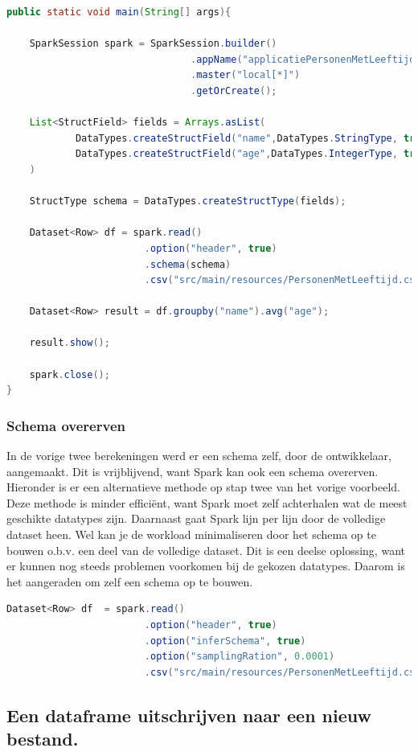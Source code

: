 \documentclass[a4paper,10pt,twoside]{report}
\begin{document}
\begin{lstlisting}[language=Java]
public static void main(String[] args){
	
	SparkSession spark = SparkSession.builder()
								.appName("applicatiePersonenMetLeeftijd")
								.master("local[*]")
								.getOrCreate();
								
	List<StructField> fields = Arrays.asList(
			DataTypes.createStructField("name",DataTypes.StringType, true),
			DataTypes.createStructField("age",DataTypes.IntegerType, true);
	)
	
	StructType schema = DataTypes.createStructType(fields);
	
	Dataset<Row> df = spark.read()
						.option("header", true)
						.schema(schema)
						.csv("src/main/resources/PersonenMetLeeftijd.csv");
	
	Dataset<Row> result = df.groupby("name").avg("age");
	
	result.show();
	
	spark.close();
}
\end{lstlisting}

\subsubsection{Schema overerven}

In de vorige twee berekeningen werd er een schema zelf, door de ontwikkelaar, aangemaakt. Dit is vrijblijvend, want Spark kan ook een schema overerven. Hieronder is er een alternatieve methode op stap twee van het vorige voorbeeld. Deze methode is minder efficiënt, want Spark moet zelf achterhalen wat de meest geschikte datatypes zijn. Daarnaast gaat Spark lijn per lijn door de volledige dataset heen. Wel kan je de workload minimaliseren door het schema op te bouwen o.b.v. een deel van de volledige dataset. Dit is een deelse oplossing, want er kunnen nog steeds problemen voorkomen bij de gekozen datatypes. Daarom is het aangeraden om zelf een schema op te bouwen.

\begin{lstlisting}[language=Java]
Dataset<Row> df  = spark.read()
						.option("header", true)
						.option("inferSchema", true)
						.option("samplingRation", 0.0001)
						.csv("src/main/resources/PersonenMetLeeftijd.csv)
\end{lstlisting}

\subsection{Een dataframe uitschrijven naar een nieuw bestand.}
\end{document}
